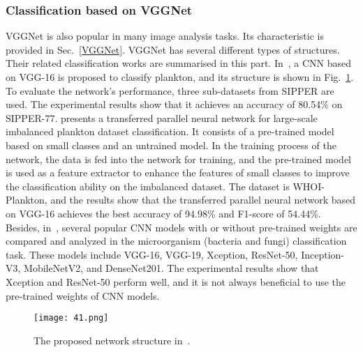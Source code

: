 \subsubsection{Classification based on VGGNet}
VGGNet is also popular in many image analysis tasks. Its characteristic is provided in Sec.~\ref{VGGNet}. VGGNet has several different types of structures. Their related classification works are summarised in this part. In~\cite{Al-2018-IPIC}, a CNN based on VGG-16 is proposed to classify plankton, and its structure is shown in Fig.~\ref{fig41}. To evaluate the network's performance, three sub-datasets from SIPPER are used. The experimental results show that it achieves an accuracy of 80.54\% on SIPPER-77. \cite{Wang-2018-TPCN} presents a transferred parallel neural network for large-scale imbalanced plankton dataset classification. It consists of a pre-trained model based on small classes and an untrained model. In the training process of the network, the data is fed into the network for training, and the pre-trained model is used as a feature extractor to enhance the features of small classes to improve the classification ability on the imbalanced dataset. The dataset is WHOI-Plankton, and the results show that the transferred parallel neural network based on VGG-16 achieves the best accuracy of 94.98\% and F1-score of 54.44\%. Besides, in~\cite{Zawadzki-2020-DLAC}, several popular CNN models with or without pre-trained weights are compared and analyzed in the microorganism (bacteria and fungi) classification task. These models include VGG-16, VGG-19, Xception, ResNet-50, Inception-V3, MobileNetV2, and DenseNet201. The experimental results show that Xception and ResNet-50 perform well, and it is not always beneficial to use the pre-trained weights of CNN models.

\begin{figure}[htbp!]
\centering
\texttt{[image: 41.png]}
\caption{The proposed network structure in~\cite{Al-2018-IPIC}.}
\label{fig41}
\end{figure}

